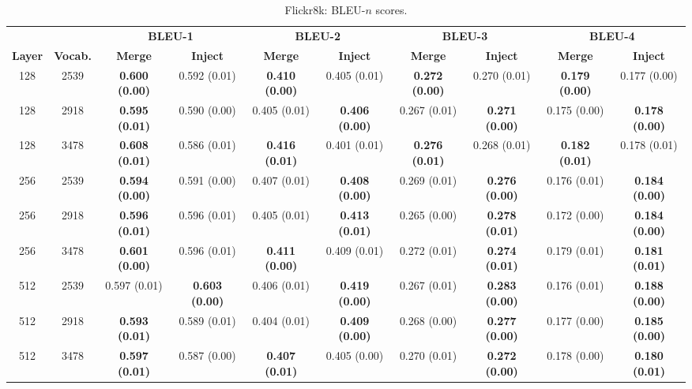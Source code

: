 \documentclass[11pt,letterpaper]{article}
\begin{document}
\begin{table*}[!t]
\begin{scriptsize}
\begin{subtable}{\textwidth}
  \centering
  \begin{tabular}{|cc|cc|cc|cc|cc|}
  \hline
  & & \multicolumn{2}{|c|}{\bf BLEU-1} & \multicolumn{2}{|c|}{\bf BLEU-2} & \multicolumn{2}{|c|}{\bf BLEU-3} & \multicolumn{2}{|c|}{\bf BLEU-4} \\
  \bf Layer & \bf Vocab. & \bf Merge & \bf Inject & \bf Merge & \bf Inject & \bf Merge & \bf Inject & \bf Merge & \bf Inject \\
  \hline
  128	& 2539	& \bf 0.600 (0.00)	& 0.592 (0.01)	& \bf 0.410 (0.00)	& 0.405 (0.01)	& \bf 0.272 (0.00)	& 0.270 (0.01)	& \bf 0.179 (0.00)	& 0.177 (0.00) \\
  128	& 2918	& \bf 0.595 (0.01)	& 0.590 (0.00)	& 0.405 (0.01)	& \bf 0.406 (0.00)	& 0.267 (0.01)	& \bf 0.271 (0.00)	& 0.175 (0.00)	& \bf 0.178 (0.00) \\
  128	& 3478	& \bf 0.608 (0.01)	& 0.586 (0.01)	& \bf 0.416 (0.01)	& 0.401 (0.01)	& \bf 0.276 (0.01)	& 0.268 (0.01)	& \bf 0.182 (0.01)	& 0.178 (0.01) \\
  \hline
  256	& 2539	& \bf 0.594 (0.00)	& 0.591 (0.00)	& 0.407 (0.01)	& \bf 0.408 (0.00)	& 0.269 (0.01)	& \bf 0.276 (0.00)	& 0.176 (0.01)	& \bf 0.184 (0.00) \\
  256	& 2918	& \bf 0.596 (0.01)	& 0.596 (0.01)	& 0.405 (0.01)	& \bf 0.413 (0.01)	& 0.265 (0.00)	& \bf 0.278 (0.01)	& 0.172 (0.00)	& \bf 0.184 (0.00) \\
  256	& 3478	& \bf 0.601 (0.00)	& 0.596 (0.01)	& \bf 0.411 (0.00)	& 0.409 (0.01)	& 0.272 (0.01)	& \bf 0.274 (0.01)	& 0.179 (0.01)	& \bf 0.181 (0.01) \\
  \hline
  512	& 2539	& 0.597 (0.01)	& \bf 0.603 (0.00)	& 0.406 (0.01)	& \bf 0.419 (0.00)	& 0.267 (0.01)	& \bf 0.283 (0.00)	& 0.176 (0.01)	& \bf 0.188 (0.00) \\
  512	& 2918	& \bf 0.593 (0.01)	& 0.589 (0.01)	& 0.404 (0.01)	& \bf 0.409 (0.00)	& 0.268 (0.00)	& \bf 0.277 (0.00)	& 0.177 (0.00)	& \bf 0.185 (0.00) \\
  512	& 3478	& \bf 0.597 (0.01)	& 0.587 (0.00)	& \bf 0.407 (0.01)	& 0.405 (0.00)	& 0.270 (0.01)	& \bf 0.272 (0.00)	& 0.178 (0.00)	& \bf 0.180 (0.01) \\
  \hline
  \end{tabular}
  \caption{\label{tbl:results_flickr8k_2} Flickr8k: BLEU-$n$ scores.}
\end{subtable}
\vspace{10pt}


\end{scriptsize}
\end{table*}
\end{document}
